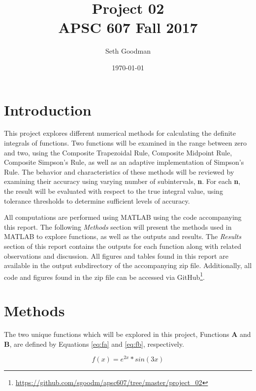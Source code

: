 \documentclass[a4paper]{article}
\title{
	Project 02 \\
	\bigskip
	\normalsize APSC 607 Fall 2017
}
\author{Seth Goodman}
\date{\today}
\begin{document}
\maketitle



\section{Introduction}
\label{sec:introduction}

This project explores different numerical methods for calculating the definite integrals of functions. Two functions will be examined in the range between zero and two, using the Composite Trapezoidal Rule, Composite Midpoint Rule, Composite Simpson’s Rule, as well as an adaptive implementation of Simpson’s Rule. The behavior and characteristics of these methods will be reviewed by examining their accuracy using varying number of subintervals, \textbf{n}. For each \textbf{n}, the result will be evaluated with respect to the true integral value, using tolerance thresholds to determine sufficient levels of accuracy. 

All computations are performed using MATLAB using the code accompanying this report. The following \textit{Methods} section will present the methods used in MATLAB to explore functions, as well as the outputs and results. The \textit{Results} section of this report contains the outputs for each function along with related observations and discussion. All figures and tables found in this report are available in the output subdirectory of the accompanying zip file. Additionally, all code and figures found in the zip file can be accessed via GitHub\footnote{\url{https://github.com/sgoodm/apsc607/tree/master/project_02}}.



\newpage
\section{Methods}
\label{sec:methods}

The two unique functions which will be explored in this project, Functions \textbf{A} and \textbf{B}, are defined by Equations \ref{eq:fa} and \ref{eq:fb}, respectively. 

\begin{equation}
f(x) = e^{2x} * sin(3x)
\label{eq:fa}
\end{equation}
\end{document}
